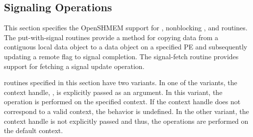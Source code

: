 \documentclass[10pt,oneside]{book}
\begin{document}
\label{subsec:shmem_atomic_fetch_nbi}


\label{subsec:shmem_atomic_compare_swap_nbi}


\label{subsec:shmem_atomic_swap_nbi}


\label{subsec:shmem_atomic_fetch_inc_nbi}


\label{subsec:shmem_atomic_fetch_add_nbi}


\label{subsec:shmem_atomic_fetch_and_nbi}


\label{subsec:shmem_atomic_fetch_or_nbi}


\label{subsec:shmem_atomic_fetch_xor_nbi}




\subsection{Signaling Operations}\label{sec:shmem_signal}
This section specifies the OpenSHMEM support for ,
nonblocking , and  routines. The
put-with-signal routines provide a method for copying data from a contiguous
local data object to a data object on a specified \ac{PE} and subsequently
updating a remote flag to signal completion. The signal-fetch routine provides
support for fetching a signal update operation.

\openshmem {} routines specified in this section have two
variants. In one of the variants, the context handle, , is explicitly
passed as an argument. In this variant, the operation is performed on the
specified context. If the context handle  does not correspond to a
valid context, the behavior is undefined. In the other variant, the context
handle is not explicitly passed and thus, the operations are performed on the
default context.
\end{document}
